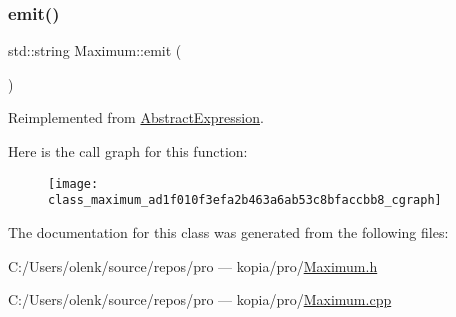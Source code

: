 \subsubsection{\texorpdfstring{emit()}{emit()}}
{\footnotesize\ttfamily std\+::string Maximum\+::emit (\begin{DoxyParamCaption}{ }\end{DoxyParamCaption})\hspace{0.3cm}{\ttfamily [virtual]}}



Reimplemented from \mbox{\hyperlink{class_abstract_expression_a9f19c05e663491688cdf4423e002a391}{Abstract\+Expression}}.

Here is the call graph for this function\+:
\nopagebreak
\begin{figure}[H]
\begin{center}
\leavevmode
\texttt{[image: class\_maximum\_ad1f010f3efa2b463a6ab53c8bfaccbb8\_cgraph]}
\end{center}
\end{figure}


The documentation for this class was generated from the following files\+:\begin{DoxyCompactItemize}
\item 
C\+:/\+Users/olenk/source/repos/pro — kopia/pro/\mbox{\hyperlink{_maximum_8h}{Maximum.\+h}}\item 
C\+:/\+Users/olenk/source/repos/pro — kopia/pro/\mbox{\hyperlink{_maximum_8cpp}{Maximum.\+cpp}}\end{DoxyCompactItemize}
